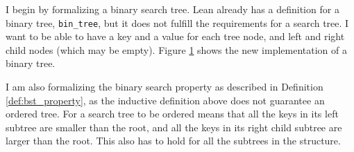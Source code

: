 I begin by formalizing a binary search tree. Lean already has a definition
for a binary tree, \lstinline{bin_tree}, but it does not fulfill the requirements for a search tree. 
I want to be able to have a key and a value for each tree node, and left and right child nodes (which may be empty).
Figure \ref{fig:btree_def} shows the new implementation of a binary tree.

\begin{figure}[!h]
  
  \caption{}
  \label{fig:btree_def}
\end{figure}


I am also formalizing the binary search property as described in Definition \ref{def:bst_property}, as the inductive definition above does not 
guarantee an ordered tree.
For a search tree to be ordered means that all the keys in its left subtree are smaller than the root, and all the keys in its right child subtree 
are larger than the root. This also has to hold for all the subtrees in the structure.

\begin{figure}[!h]
  
  \caption{}
  \label{fig:forall_keys}
\end{figure}


\begin{figure}[!h]
  
  \caption{}
  \label{fig:ordered}
\end{figure}
